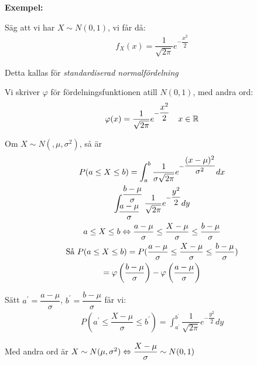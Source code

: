\par\bigskip
\noindent\textbf{Exempel:}\par
\noindent Säg att vi har $X\sim N(0,1)$, vi får då:
\begin{equation*}
  \begin{gathered}
    f_X(x) = \dfrac{1}{\sqrt{2\pi}}e^{-\dfrac{x^2}{2}}
  \end{gathered}
\end{equation*}
\par\bigskip
\noindent Detta kallas för \textit{standardiserad normalfördelning}\par
\noindent Vi skriver $\varphi$ för fördelningsfunktionen atill $N(0,1)$, med andra ord:
\begin{equation*}
  \begin{gathered}
    \varphi(x) = \dfrac{1}{\sqrt{2\pi}}e^{-\dfrac{x^2}{2}}\quad x\in\mathbb{R}
  \end{gathered}
\end{equation*}
\par\bigskip
\noindent Om $X\sim N(,\mu,\sigma^2)$, så är
\begin{equation*}
  \begin{gathered}
    P(a\leq X\leq b) = \int_{a}^{b}\dfrac{1}{\sigma\sqrt{2\pi}}e^{-\dfrac{(x-\mu)^2}{\sigma^2}}dx\\
    \int_{\dfrac{a-\mu}{\sigma}}^{\dfrac{b-\mu}{\sigma}}\dfrac{1}{\sqrt{2\pi}}e^{-\dfrac{y^2}{2}}dy\\
    a\leq X\leq b\Leftrightarrow \dfrac{a-\mu}{\sigma}\leq \dfrac{X-\mu}{\sigma}\leq \dfrac{b-\mu}{\sigma}\\
    \text{Så } P(a\leq X\leq b) = P(\dfrac{a-\mu}{\sigma}\leq \dfrac{X-\mu}{\sigma}\leq \dfrac{b-\mu}{\sigma})\\
    = \varphi\left(\dfrac{b-\mu}{\sigma}\right)-\varphi\left(\dfrac{a-\mu}{\sigma}\right)
  \end{gathered}
\end{equation*}
\par\bigskip
\noindent Sätt $a^{\prime} = \dfrac{a-\mu}{\sigma}$, $b^{\prime} = \dfrac{b-\mu}{\sigma}$ får vi:
\begin{equation*}
  \begin{gathered}
    P(a^{\prime}\leq \dfrac{X-\mu}{\sigma}\leq b^{\prime}) = \int_{a^{\prime}}^{b^{\prime}}\dfrac{1}{\sqrt{2\pi}}e^{-\dfrac{y^2}{2}}dy
  \end{gathered}
\end{equation*}
\par\bigskip
\noindent Med andra ord är $X\sim N(\mu, \sigma^2)\Leftrightarrow\dfrac{X-\mu}{\sigma}\sim N(0,1)$
